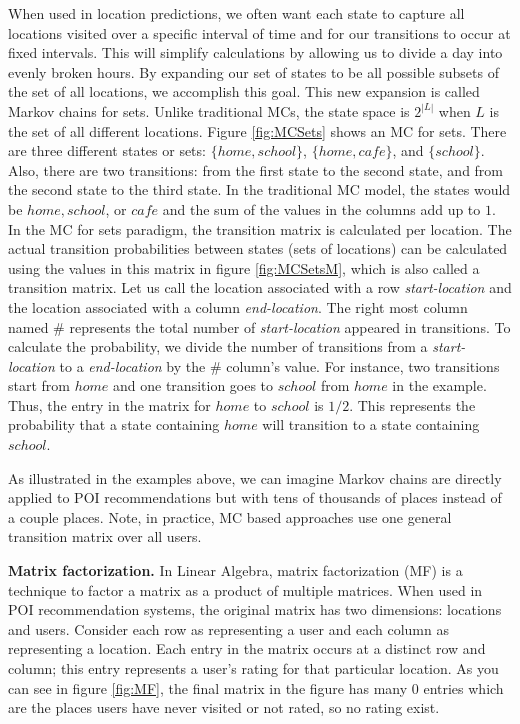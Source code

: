 \documentclass{sig-alternate}
\begin{document}
When used in location predictions, we often want each state to capture all locations visited over a specific interval of time 
and for our transitions to occur at fixed intervals. This will simplify calculations by allowing us to divide a day into evenly broken hours. 
By expanding our set of states to be all possible subsets of the set of all locations, we accomplish this goal. 
This new expansion is called Markov chains for sets. Unlike traditional MCs, the state space is $2^{|L|}$ when 
$L$ is the set of all different locations. Figure \ref{fig:MCSets} shows an MC for sets. There are three different states or sets:
$\{home, school\}$, $\{home, cafe\}$, and $\{school\}$. Also, there are two transitions: from the first state to the second 
state, and from the second state to the third state. 
In the traditional MC model, the states would be $home, school$, or $cafe$ and the sum of the values in the columns add up to $1$. 
In the MC for sets paradigm, the transition matrix is calculated per location. 
The actual transition probabilities between states (sets of locations) can be calculated using the values in this matrix in figure \ref{fig:MCSetsM}, 
which is also called a transition matrix. Let us call the location associated with a row \emph{start-location} and the location associated with a column \emph{end-location}. 
The right most column named \# represents the total number of \emph{start-location} appeared in transitions.
To calculate the probability, we divide the number of transitions from a \emph{start-location} to a \emph{end-location} by the \# 
column's value. For instance, two transitions start from $home$ and one transition goes to $school$ from $home$ in
the example. Thus, the entry in the matrix for $home$ to $school$ is $1/2$. 
This represents the probability that a state containing $home$ will transition to a state containing $school$.

As illustrated in the examples above, we can imagine Markov chains are directly applied to 
POI recommendations but with tens of thousands of places instead of a couple places. Note, in practice, MC based 
approaches use one general transition matrix over all users.

\textbf{Matrix factorization.} In Linear Algebra, matrix factorization (MF) is a technique to 
factor a matrix as a product of multiple matrices. When used in POI recommendation systems, 
the original matrix has two dimensions: locations and users. Consider each row as representing a user and each column 
as representing a location. Each entry in the matrix occurs at a distinct row and column; this entry represents a user's rating 
for that particular location. As you can see in figure \ref{fig:MF}, the final matrix in the figure
has many 0 entries which are the places users have never visited or not rated, so no rating exist. 
\end{document}
